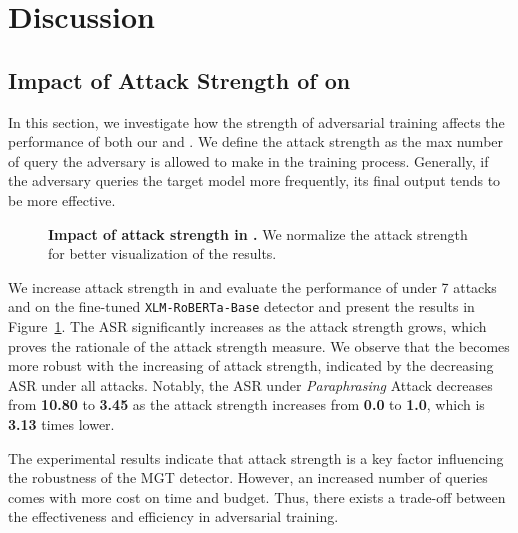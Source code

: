 \section{Discussion}
\label{sec:discussion}

\subsection{Impact of Attack Strength of \attackname on }
In this section, we investigate how the strength of adversarial training affects the performance of both our  and \attackname.
We define the attack strength as the max number of query the adversary is allowed to make in the training process.
Generally, if the adversary queries the target model more frequently, its final output tends to be more effective.
\begin{figure}[t]
    \centering
	\caption{
    \textbf{Impact of attack strength in \modelname.}
    We normalize the attack strength for better visualization of the results.
	}
    \label{fig:compare} 
    \vspace{-0.5cm}
\end{figure}
We increase attack strength in \modelname and evaluate the performance of  under 7 attacks and \attackname on the fine-tuned \texttt{XLM-RoBERTa-Base} detector and present the results in Figure~\ref{fig:compare}. 
The ASR significantly increases as the attack strength grows, which proves the rationale of the attack strength measure.
We observe that the  becomes more robust with the increasing of attack strength, indicated by the decreasing ASR under all attacks.
Notably, the ASR under \textit{Paraphrasing} Attack decreases from \textbf{10.80} to \textbf{3.45} as the attack strength increases from \textbf{0.0} to \textbf{1.0}, which is \textbf{3.13} times lower.

The experimental results indicate that attack strength is a key factor influencing the robustness of the MGT detector. 
However, an increased number of queries comes with more cost on time and budget.
Thus, there exists a trade-off between the effectiveness and efficiency in adversarial training.